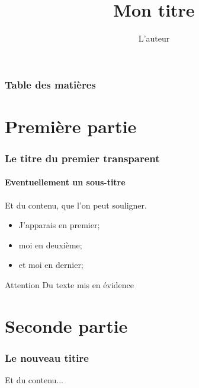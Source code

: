 \documentclass[dvips]{beamer}
\title{Mon titre}
\author{L'auteur}
\begin{document}
\begin{frame}
  \titlepage
\end{frame}

\begin{frame}
  \frametitle{Table des matières}
  \tableofcontents
\end{frame}

\section{Première partie}
\begin{frame}
  \frametitle{Le titre du premier transparent}
  \framesubtitle{Eventuellement un sous-titre}

  Et du contenu, que l'on peut
  \alert{souligner}.

  \begin{itemize}
    \item<1-> J'apparais en premier;
    \item<2-> moi en deuxième;
    \item<3-> et moi en dernier;
  \end{itemize}

  \begin{block}{Attention}
    Du texte mis en évidence
  \end{block}
\end{frame}

\section{Seconde partie}
\begin{frame}
  \frametitle{Le nouveau titire}
  Et du contenu...
\end{frame}
\end{document}
